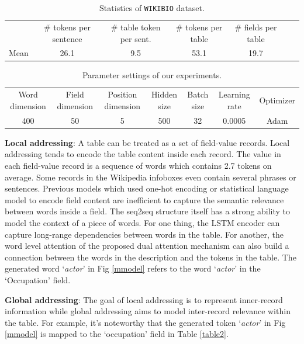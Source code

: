 \documentclass[letterpaper]{article} %
\begin{document}
\begin{table}[htbp]
\small
\centering
\begin{tabular}{ccccccc}
  \hline 
  & \# tokens per sentence & \# table token per sent.  & \# tokens per table & \# fields per table \\
Mean & 26.1 & 9.5 & 53.1 & 19.7 \\\hline
\end{tabular}
\caption{\label{corpus-stat}Statistics of \texttt{WIKIBIO} dataset.}
\end{table}

\begin{table}[htbp]
\small
\centering
\begin{tabular}{ccccccc}
  \hline 
Word dimension & Field dimension & Position dimension & Hidden size & Batch size & Learning rate & Optimizer\\
400 & 50 & 5 & 500 & 32 & 0.0005 & Adam \\\hline
\end{tabular}
\caption{\label{parameter}Parameter settings of our experiments.}
\end{table}


\textbf{Local addressing}: A table can be treated as a set of field-value records. Local addressing tends to encode the table content inside each record. 
The value in each field-value record is a sequence of words
which contains 2.7 tokens on average.
Some records in the Wikipedia infoboxes even contain several phrases or sentences. 
Previous models which used one-hot encoding or statistical language model to encode field content are inefficient to capture the semantic relevance between words inside a field. 
The seq2seq structure itself has a strong ability to model the context of a piece of words. For one thing, the LSTM encoder can capture long-range dependencies between words in the table. For another, the word level attention of the proposed dual attention mechanism can also build a connection between the words in the description and the tokens in the table. The generated word `\textit{actor}' in Fig \ref{mmodel} refers to the word `\textit{actor}' in the `Occupation' field.

\textbf{Global addressing}: 
The goal of local addressing is to represent inner-record information while global addressing aims to model inter-record relevance within the table.   
For example, it's noteworthy that the generated token `\textit{actor}' in Fig \ref{mmodel} is mapped to the `occupation' field in Table \ref{table2}.
  
\end{document}
